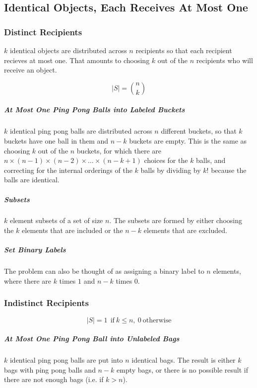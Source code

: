 \subsection{Identical Objects, Each Receives At Most One}

\subsubsection{Distinct Recipients}
$k$ identical objects are distributed across $n$ recipients so that each recipient recieves at most one. That amounts to choosing $k$ out of the $n$ recipients who will receive an object.

\begin{equation}
|S| = { n \choose k}
\end{equation}


\subparagraph{At Most One Ping Pong Balls into Labeled Buckets} $k$ identical ping pong balls are distributed across $n$ different buckets, so that $k$ buckets have one ball in them and $n-k$ buckets are empty. This is the same as choosing $k$ out of the $n$ buckets, for which there are $n\times(n-1)\times(n-2)\times\hdots\times(n-k+1)$ choices for the $k$ balls, and correcting for the internal orderings of the $k$ balls by dividing by $k!$ because the balls are identical.

\subparagraph{Subsets} $k$ element subsets of a set of size $n$. The subsets are formed by either choosing the $k$ elements that are included or the $n-k$ elements that are excluded.

\subparagraph{Set Binary Labels} The problem can also be thought of as assigning a binary label to $n$ elements, where there are $k$ times $1$ and $n-k$ times 0.

\subsubsection{Indistinct Recipients}

\begin{equation}
|S| = 1\ \ \mathrm{if\ }k \leq n,\ 0\ \mathrm{otherwise}
\end{equation}

\subparagraph{At Most One Ping Pong Ball into Unlabeled Bags}  $k$ identical ping pong balls are put into $n$ identical bags. The result is either $k$ bags with ping pong balls and $n-k$ empty bags, or there is no possible result if there are not enough bags (i.e. if $k>n$).

